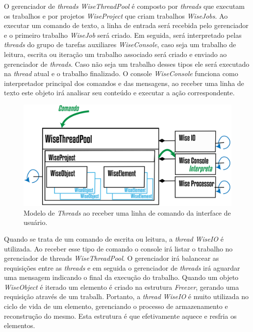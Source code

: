 O gerenciador de \textit{threads} \textit{WiseThreadPool} é composto por \textit{threads} que executam os trabalhos e por projetos \textit{WiseProject} que criam trabalhos \textit{WiseJobs}. Ao executar um comando de texto, a linha de entrada será recebida pelo gerenciador e o primeiro trabalho \textit{WiseJob} será criado. Em seguida, será interpretado pelas \textit{threads} do grupo de tarefas auxiliares \textit{WiseConsole}, caso seja um trabalho de leitura, escrita ou iteração um trabalho associado será criado e enviado ao gerenciador de \textit{threads}. Caso não seja um trabalho desses tipos ele será executado na \textit{thread} atual e o trabalho finalizado. O console \textit{WiseConsole} funciona como interpretador principal dos comandos e das mensagens, ao receber uma linha de texto este objeto irá analisar seu conteúdo e executar a ação correspondente.

\begin{figure}[!htbp]
	\centering
	\includegraphics[width=\linewidth]{Figures/WiseThreaPoolCMD@16x.png}
	\caption{Modelo de \textit{Threads} ao receber uma linha de comando da interface de usuário.}
	\label{fig8:threads}
\end{figure}

Quando se trata de um comando de escrita ou leitura, a \textit{thread} \textit{WiseIO} é utilizada. Ao receber esse tipo de comando o console irá listar o trabalho no gerenciador de threads \textit{WiseThreadPool}. O gerenciador irá balancear as requisições entre as \textit{threads} e em seguida o gerenciador de \textit{threads} irá aguardar uma mensagem indicando o final da execução do trabalho. Quando um objeto \textit{WiseObject} é iterado um elemento é criado na estrutura \textit{Freezer}, gerando uma requisição através de um trabalh. Portanto, a \textit{thread} \textit{WiseIO} é muito utilizada no ciclo de vida de um elemento, gerenciando o processo de armazenamento e reconstrução do mesmo. Esta estrutura é que efetivamente aquece e resfria os elementos.

